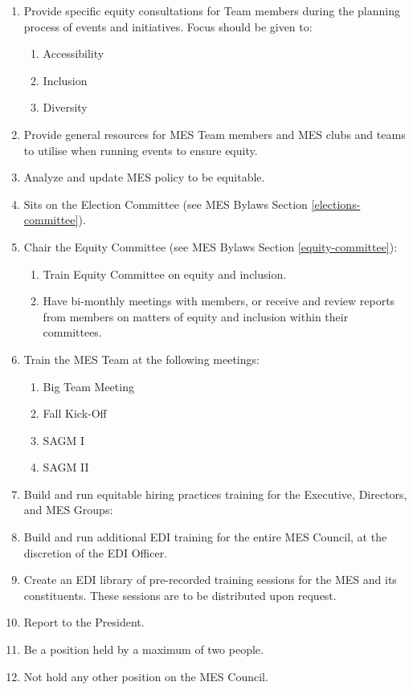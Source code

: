 \begin{enumerate}
 \item
  Provide specific equity consultations for Team members during the planning process of events and initiatives. Focus should be given to:

  \begin{enumerate}
   \item
    Accessibility
   \item
    Inclusion
   \item
    Diversity
  \end{enumerate}
 \item
  Provide general resources for MES Team members and MES clubs and teams to utilise when running events to ensure equity.
 \item
  Analyze and update MES policy to be equitable.
 \item
  Sits on the Election Committee (see MES Bylaws Section \ref{elections-committee}).
 \item
  Chair the Equity Committee (see MES Bylaws Section \ref{equity-committee}):

  \begin{enumerate}
   \item
    Train Equity Committee on equity and inclusion.
   \item
    Have bi-monthly meetings with members, or receive and review reports from members on matters of equity and inclusion within their committees.
  \end{enumerate}
 \item
  Train the MES Team at the following meetings:

  \begin{enumerate}
   \item
    Big Team Meeting
   \item
    Fall Kick-Off
   \item
    SAGM I
   \item
    SAGM II
  \end{enumerate}
 \item
  Build and run equitable hiring practices training for the Executive, Directors, and MES Groups:
 \item
  Build and run additional EDI training for the entire MES Council, at the discretion of the EDI Officer.
 \item
  Create an EDI library of pre-recorded training sessions for the MES and its constituents. These sessions are to be distributed upon request.
 \item
  Report to the President.
 \item
  Be a position held by a maximum of two people.
 \item
  Not hold any other position on the MES Council.

\end{enumerate}

